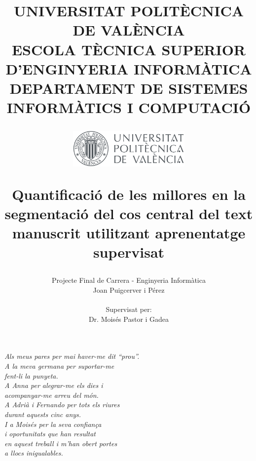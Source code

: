 \documentclass[11pt,catalan,a4paper,authoryear,twoside]{book}
\title{
  \begin{small}
    UNIVERSITAT POLITÈCNICA DE VALÈNCIA\\
  \vspace{0.25cm}
    ESCOLA TÈCNICA SUPERIOR D'ENGINYERIA INFORMÀTICA\\
  \vspace{0.25cm}
    DEPARTAMENT DE SISTEMES INFORMÀTICS I COMPUTACIÓ\\
  \end{small}
  \vspace{1cm}
  \begin{center}
    \mbox{\includegraphics[width=6cm]{upv_val}}
  \end{center}
  \vspace{1cm}
  \begin{LARGE}
    Quantificació de les millores en la segmentació del cos central del text manuscrit utilitzant aprenentatge supervisat
  \end{LARGE}
}
\author{
  \vspace{1cm}
  \small{Projecte Final de Carrera - Enginyeria Informàtica}\\
  Joan Puigcerver i Pérez\\
  \\
  Supervisat per:\\
  Dr. Moisés Pastor i Gadea
}
\newcommand{\clearemptydoublepage}{\newpage{\pagestyle{empty}\cleardoublepage}}
\begin{document}
\frontmatter

\maketitle
\clearemptydoublepage

\newpage\thispagestyle{empty}

\vspace*{2in}
\begin{flushright}
{\large {\it 
Als meus pares per mai haver-me dit ``prou''.\\
A la meva germana per suportar-me\\
fent-li la punyeta.\\
A Anna per alegrar-me els dies i\\
acompanyar-me arreu del món.\\ 
A Adrià i Fernando per tots els riures\\
durant aquests cinc anys.\\
I a Moisés per la seva confiança\\
i oportunitats que han resultat\\
en aquest treball i m'han obert portes\\
a llocs inigualables.}}
\end{flushright}

\clearemptydoublepage

\tableofcontents

\clearemptydoublepage

\mainmatter



\clearemptydoublepage


\clearemptydoublepage


\clearemptydoublepage


\clearemptydoublepage


\clearemptydoublepage




\listoffigures
\listoftables
\end{document}
